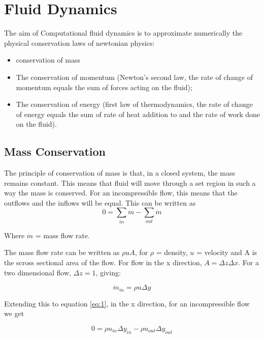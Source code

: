 \section{Fluid Dynamics}
The aim of Computational fluid dynamics is to approximate numerically the physical conservation laws of newtonian physics:

\begin{itemize}
  \item conservation of mass

  \item The conservation of momentum (Newton’s second law, the rate of change of momentum equals the sum of forces acting on the fluid);

  \item The conservation of energy (first law of thermodynamics, the rate of change of energy equals the sum of rate of heat addition to and the rate of work done on the fluid).

\end{itemize}

    \subsection{Mass Conservation}

    The principle of conservation of mass is that, in a closed system, the mass remains constant. This means that fluid will move through a set region in such a way the mass is conserved. For an incompressible flow, this means that the outflows and the inflows will be equal. This can be written as
    \begin{equation} \label{eq:1}
      0 = \sum_{in} \dot{m} - \sum_{out} \dot{m}
    \end{equation} 

    Where $\dot{m}$ = mass flow rate.
    
    The mass flow rate can be written as $ \rho u A $,  for $\rho$ = density, $u$ = velocity and A is the scross sectional area of the flow. For flow in the x direction, $ A = \Delta z \Delta x $. For a two dimensional flow, $ \Delta z = 1 $, giving:

    \begin{equation} \label{eq:2}
      \dot{m}_{in} = \rho u \Delta y
    \end{equation}

    Extending this to equation \ref{eq:1}, in the x direction, for an incompressible flow we get

    \begin{equation} \label{eq:3}
      0 = \rho u_{in} \Delta y_{in} - \rho u_{out} \Delta y_{out}
    \end{equation}

